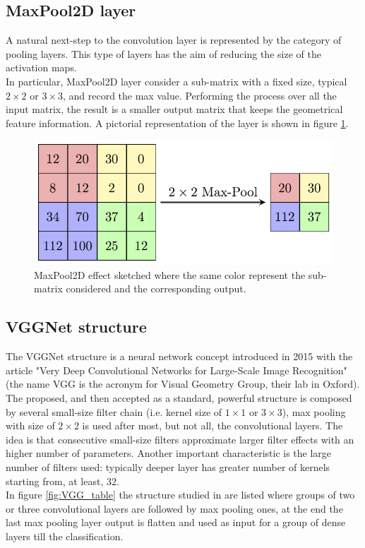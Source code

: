 \subsection*{MaxPool2D layer}
A natural next-step to the convolution layer is represented by the category of pooling layers. This type of layers has the aim of reducing the size of the activation maps.\\
In particular, MaxPool2D layer consider a sub-matrix with a fixed size, typical $2\times2$ or $3\times3$, and record the max value. Performing the process over all the input matrix, the result is a smaller output matrix that keeps the geometrical feature information. A pictorial representation of the layer is shown in figure \ref{fig:MaxPool}.

\begin{figure}[b]
	\centering
	\includegraphics[width=.6\textwidth]{IMG/Cap6/MaxpoolSample2.png}
	\caption{MaxPool2D effect sketched where the same color represent the sub-matrix considered and the corresponding output.}
	\label{fig:MaxPool}
\end{figure}



\subsection*{VGGNet structure} \label{subsec:VGGNet_teo}
The VGGNet structure is a neural network concept introduced in 2015 with the article "Very Deep Convolutional Networks for Large-Scale Image Recognition" \cite{VGGArt} (the name VGG is the acronym for Visual Geometry Group, their lab in Oxford).\\
The proposed, and then accepted as a standard, powerful structure is composed by several small-size filter chain (i.e. kernel size of $1\times1$ or $3\times3$), max pooling with size of $2\times2$ is used after most, but not all, the convolutional layers. The idea is that consecutive small-size filters approximate larger filter effects with an higher number of parameters. Another important characteristic is the large number of filters used: typically deeper layer has greater number of kernels starting from, at least, $32$.\\
In figure \ref{fig:VGG_table} the structure studied in \cite{VGGArt} are listed where groups of two or three convolutional layers are followed by max pooling ones, at the end the last max pooling layer output is flatten and used as input for a group of dense layers till the classification.\\

